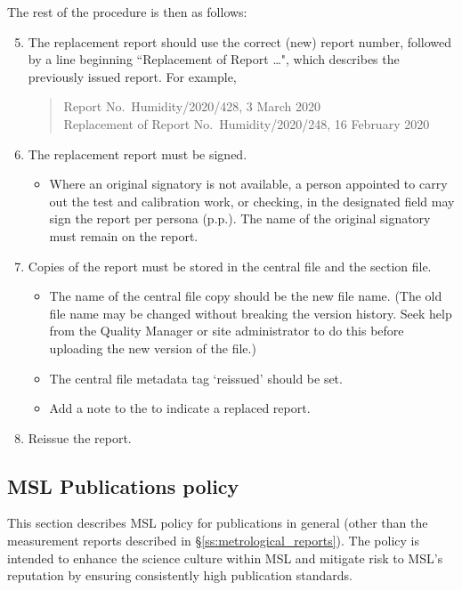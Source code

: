 The rest of the procedure is then as follows: 
\begin{enumerate}
\setcounter{enumi}{4}
\item The replacement report should use the correct (new) report number, followed by a line beginning ``Replacement of Report \ldots", which describes the previously issued report. For example, 
\begin{quote}
Report No.\ Humidity/2020/428, 3 March 2020\\
 Replacement of Report No.\ Humidity/2020/248, 16 February 2020
\end{quote}

\item The replacement report must be signed.
\begin{itemize}
\item Where an original signatory is not available, a person appointed to carry out the test and calibration work, or checking, in the designated field may sign the report per persona (p.p.).  The name of the original signatory must remain on the report.
\end{itemize}

\item Copies of the report must be stored in the central file and the section file.
\begin{itemize}
\item The name of the central file copy should be the new file name. (The old file name may be changed  without breaking the version history. Seek help from the Quality Manager or site administrator to do this before uploading the new version of the file.) 
\item The central file metadata tag `reissued' should be set.
\item Add a note to the  to indicate a replaced report.
\end{itemize}
\item Reissue the report.

\end{enumerate}



\subsection{MSL Publications policy}
\label{ss:msl_publications_policy}

This section describes MSL policy for publications in general (other than the measurement reports described in \S\ref{ss:metrological_reports}). The policy is intended to enhance the science culture within MSL and mitigate risk to MSL's reputation by ensuring consistently high publication standards.   


